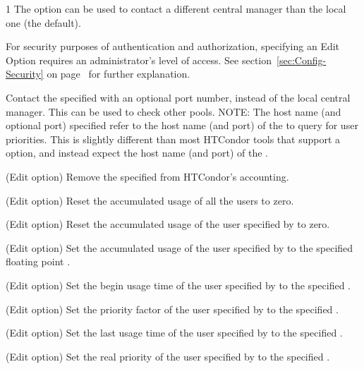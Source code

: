 \begin{ManPage}{\label{man-condor-userprio}}{1}
The  option can be used to contact a different central manager 
than the local one (the default).


For security purposes  of authentication and authorization,
specifying an Edit Option requires an administrator's level of access.
See section~\ref{sec:Config-Security} on page~\pageref{sec:Config-Security}
for further explanation.

\begin{Options}

  {Contact the specified  with an
  optional port number, instead of the local central manager. 
  This can be used to check other pools.  
  NOTE: The host name (and optional port) specified refer to the host name
  (and port) of the  to query for user priorities.
  This is slightly different than most HTCondor tools
  that support a  option,
  and instead expect the host name (and port) of the .}

  {(Edit option) Remove the specified  from HTCondor's accounting.}

  {(Edit option) Reset the accumulated usage of all the users to zero.}

  {(Edit option) Reset the accumulated usage of the user specified by
   to zero. }

  {(Edit option) Set the accumulated usage of the user specified by
   to the specified floating point . }

  {(Edit option) Set the begin usage time of the user specified by
   to the specified . }

  {(Edit option) Set the priority factor of the user specified by
   to the specified .  }

  {(Edit option) Set the last usage time of the user specified by
   to the specified .  }

  {(Edit option) Set the real priority of the user specified by
   to the specified .  }


\end{Options}
\end{ManPage}
